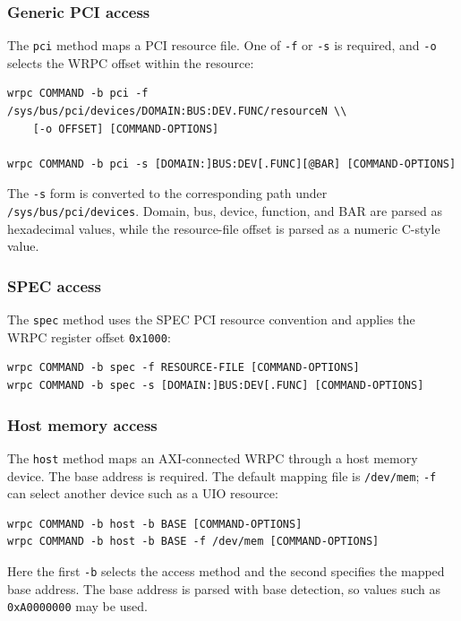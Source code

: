 \documentclass[a4paper,12pt]{article}
\begin{document}
\subsubsection{Generic PCI access}

The \texttt{pci} method maps a PCI resource file. One of \texttt{-f} or
\texttt{-s} is required, and \texttt{-o} selects the WRPC offset within the
resource:

\begin{lstlisting}
wrpc COMMAND -b pci -f /sys/bus/pci/devices/DOMAIN:BUS:DEV.FUNC/resourceN \\
    [-o OFFSET] [COMMAND-OPTIONS]

wrpc COMMAND -b pci -s [DOMAIN:]BUS:DEV[.FUNC][@BAR] [COMMAND-OPTIONS]
\end{lstlisting}

The \texttt{-s} form is converted to the corresponding path under
\texttt{/sys/bus/pci/devices}. Domain, bus, device, function, and BAR are
parsed as hexadecimal values, while the resource-file offset is parsed as a
numeric C-style value.

\subsubsection{SPEC access}

The \texttt{spec} method uses the SPEC PCI resource convention and applies the
WRPC register offset \texttt{0x1000}:

\begin{lstlisting}
wrpc COMMAND -b spec -f RESOURCE-FILE [COMMAND-OPTIONS]
wrpc COMMAND -b spec -s [DOMAIN:]BUS:DEV[.FUNC] [COMMAND-OPTIONS]
\end{lstlisting}

\subsubsection{Host memory access}

The \texttt{host} method maps an AXI-connected WRPC through a host memory
device. The base address is required. The default mapping file is
\texttt{/dev/mem}; \texttt{-f} can select another device such as a UIO
resource:

\begin{lstlisting}
wrpc COMMAND -b host -b BASE [COMMAND-OPTIONS]
wrpc COMMAND -b host -b BASE -f /dev/mem [COMMAND-OPTIONS]
\end{lstlisting}

Here the first \texttt{-b} selects the access method and the second specifies
the mapped base address. The base address is parsed with base detection, so
values such as \texttt{0xA0000000} may be used.
\end{document}
